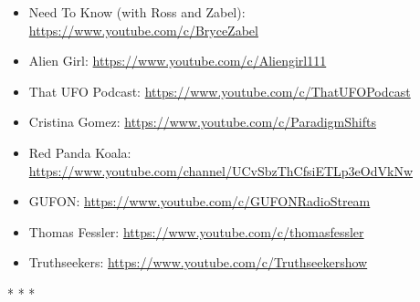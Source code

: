 \begin{itemize}
\item Need To Know (with Ross and Zabel): \url{https://www.youtube.com/c/BryceZabel}

\item Alien Girl: \url{https://www.youtube.com/c/Aliengirl111}

\item That UFO Podcast: \url{https://www.youtube.com/c/ThatUFOPodcast}

\item Cristina Gomez: \url{https://www.youtube.com/c/ParadigmShifts}

\item Red Panda Koala: \url{https://www.youtube.com/channel/UCvSbzThCfsiETLp3eOdVkNw}

\item GUFON: \url{https://www.youtube.com/c/GUFONRadioStream}

\item Thomas Fessler: \url{https://www.youtube.com/c/thomasfessler}

\item Truthseekers: \url{https://www.youtube.com/c/Truthseekershow}
\end{itemize}


\begin{center}* * *\end{center}

